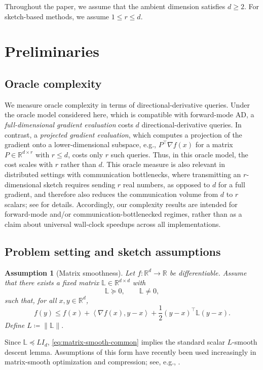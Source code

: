 \documentclass[10pt]{article}
\newtheorem{assumption}[assumption]{Assumption}
\newcommand{\R}{\mathbb{R}}
\newcommand{\ip}[2]{\left\langle #1,#2\right\rangle}
\newcommand{\Lmat}{\mathbb{L}}
\begin{document}
Throughout the paper, we assume that the ambient dimension satisfies \(d\ge 2\). For sketch-based methods, we assume \(1\le r\le d\).




\section{Preliminaries}
\label{sec:preliminaries}

\subsection{Oracle complexity}
\label{sec:oracle-complexity}
We measure oracle complexity in terms of directional-derivative queries.
Under the oracle model considered here, which is compatible with forward-mode AD, a \emph{full-dimensional gradient evaluation} costs \(d\) directional-derivative queries.
In contrast, a \emph{projected gradient evaluation}, which computes a projection of the gradient onto a lower-dimensional subspace, e.g., \(P^\top \nabla f(x)\) for a matrix \(P\in\mathbb{R}^{d\times r}\) with \(r\le d\), costs only \(r\) such queries.
Thus, in this oracle model, the cost scales with \(r\) rather than \(d\).
This oracle measure is also relevant in distributed settings with communication bottlenecks, where transmitting an \(r\)-dimensional sketch requires sending \(r\) real numbers, as opposed to \(d\) for a full gradient, 
and therefore also reduces the communication volume from \(d\) to \(r\) scalars; see
 for details.
Accordingly, our complexity results are intended for forward-mode and/or communication-bottlenecked regimes, rather than as a claim about universal wall-clock speedups across all implementations.


\subsection{Problem setting and sketch assumptions}
\begin{assumption}[Matrix smoothness]
\label{ass:matrix-smooth-common}
Let \(f:\R^d\to\R\) be differentiable. Assume that there exists a fixed matrix
\(\Lmat\in\R^{d\times d}\) with
\[
\Lmat \succeq 0,
\qquad
\Lmat \neq 0,
\]
such that, for all \(x,y\in\R^d\),
\begin{equation}
f(y)\le f(x)+\ip{\nabla f(x)}{y-x}+\frac12 (y-x)^\top \Lmat (y-x).
\label{eq:matrix-smooth-common}
\end{equation}
Define
\(
L \coloneqq \|\Lmat\|.
\)
\end{assumption}
Since \(\Lmat\preceq L I_d\), \eqref{eq:matrix-smooth-common} implies the
standard scalar \(L\)-smooth descent lemma.
Assumptions of this form have recently been used increasingly in matrix-smooth optimization and compression; see, e.g., \citet{wang2022smoothnessaware,li2023detCGD,maranjyan2025gradskip,hanzely2019,flynn2024}.
\end{document}

